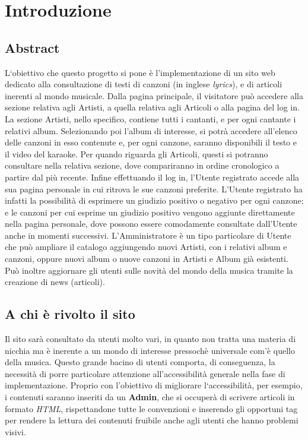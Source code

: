 \section{Introduzione}

\subsection{Abstract}
L`obiettivo che questo progetto si pone \`e l'implementazione di un sito web dedicato alla consultazione di testi di canzoni (in inglese \textit{lyrics}), e di articoli inerenti al mondo musicale. 
Dalla pagina principale, il visitatore pu\`o accedere alla sezione relativa agli Artisti, a quella relativa agli Articoli o alla pagina del log in.
La sezione Artisti, nello specifico, contiene tutti i cantanti, e per ogni cantante i relativi album. Selezionando poi l'album di interesse, si potr\`a accedere all'elenco delle canzoni in esso contenute e, per ogni canzone, saranno disponibili il testo e il video del karaoke.
Per quando riguarda gli Articoli, questi si potranno consultare nella relativa sezione, dove compariranno in ordine cronologico a partire dal pi\`u recente.
Infine effettuando il log in, l'Utente registrato accede alla sua pagina personale in cui ritrova le sue canzoni preferite. L'Utente registrato ha infatti la possibilit\`a di esprimere un giudizio positivo o negativo per ogni canzone; e le canzoni per cui esprime un giudizio positivo vengono aggiunte direttamente nella pagina personale, dove possono essere comodamente consultate dall'Utente anche in momenti successivi.
L'Amministratore è un tipo particolare di Utente che pu\`o ampliare il catalogo aggiungendo nuovi Artisti, con i relativi album e canzoni, oppure nuovi album o nuove canzoni in Artisti e Album gi\`a esistenti. Può inoltre aggiornare gli utenti sulle novità del mondo della musica tramite la creazione di news (articoli).


\newpage %


\subsection{A chi è rivolto il sito}
Il sito sar\`a consultato da utenti molto vari, in quanto non tratta una materia di nicchia ma \`e inerente a un mondo di interesse pressoch\`e universale com'\`e quello della musica. Questo grande bacino di utenti comporta, di conseguenza, la necessit\`a di porre particolare attenzione all'accessibilit\`a generale nella fase di implementazione. Proprio con l'obiettivo di migliorare l`accessibilit\`a, per esempio, i contenuti saranno inseriti da un \textbf{Admin}, che si occuperà di scrivere articoli in formato \textit{HTML}, rispettandone tutte le convenzioni e inserendo gli opportuni tag per rendere la lettura dei contenuti fruibile anche agli utenti che hanno problemi visivi.
